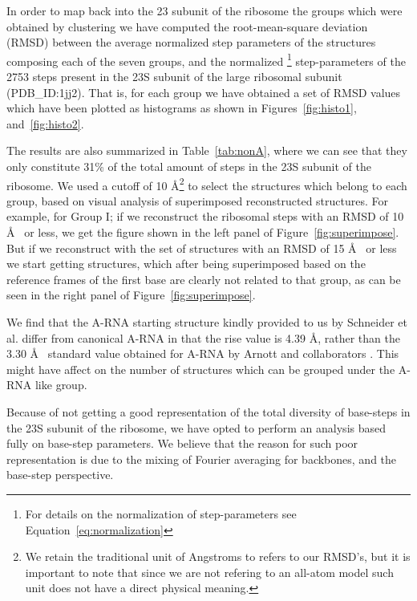 In order  to map back into the  23 subunit of the  ribosome the groups
which   were   obtained   by   clustering   we   have   computed   the
root-mean-square deviation (RMSD)  between the average normalized step
parameters of the  structures composing each of the  seven groups, and
the   normalized  \footnote{For  details   on  the   normalization  of
  step-parameters see Equation~\ref{eq:normalization}} step-parameters of the
2753 steps present  in the 23S subunit of  the large ribosomal subunit
(PDB\_ID:1jj2).  That  is, for  each group we  have obtained a  set of
RMSD  values  which  have  been  plotted as  histograms  as  shown  in
Figures~\ref{fig:histo1}, and~\ref{fig:histo2}.

The results are also  summarized in Table~\ref{tab:nonA}, where we can
see that they only constitute 31\% of the total amount of steps in the
23S subunit of the ribosome.  We  used a cutoff of 10 \AA \footnote{We
  retain the  traditional unit of  Angstroms to refers to  our RMSD's,
  but it  is important to  note that since  we are not refering  to an
  all-atom model such  unit does not have a  direct physical meaning.}
to select the  structures which belong to each  group, based on visual
analysis  of superimposed reconstructed  structures. For  example, for
Group I; if we reconstruct the ribosomal steps with an RMSD of 10 \AA~
or   less,  we   get  the   figure  shown   in  the   left   panel  of
Figure~\ref{fig:superimpose}. But  if we  reconstruct with the  set of
structures  with  an  RMSD  of  15  \AA~  or  less  we  start  getting
structures,  which after  being  superimposed based  on the  reference
frames of the first base are clearly not related to that group, as can
be seen in the right panel of Figure~\ref{fig:superimpose}.

We find  that the  A-RNA starting structure  kindly provided to  us by
Schneider et al. differ from canonical A-RNA in that the rise value is
4.39 \AA, rather than the  3.30 \AA~ standard value obtained for A-RNA
by Arnott and collaborators  \cite{arnott1973}. This might have affect
on the number of structures which  can be grouped under the A-RNA like
group.

Because of not getting a good representation of the total diversity of
base-steps  in the  23S  subunit of  the  ribosome, we  have opted  to
perform an  analysis based fully  on base-step parameters.  We believe
that the reason  for such poor representation is due  to the mixing of
Fourier averaging for backbones, and  the base-step perspective.

